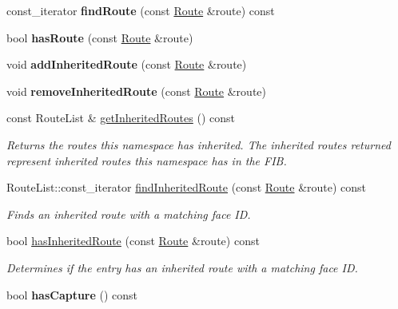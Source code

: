 \begin{DoxyCompactItemize}
\item 
const\+\_\+iterator {\bfseries find\+Route} (const \hyperlink{classnfd_1_1rib_1_1Route}{Route} \&route) const\hypertarget{classnfd_1_1rib_1_1RibEntry_ab8f111d73beaa1fca110e9986266afa0}{}\label{classnfd_1_1rib_1_1RibEntry_ab8f111d73beaa1fca110e9986266afa0}

\item 
bool {\bfseries has\+Route} (const \hyperlink{classnfd_1_1rib_1_1Route}{Route} \&route)\hypertarget{classnfd_1_1rib_1_1RibEntry_adb22892a49ce974b17d537cbe509aba1}{}\label{classnfd_1_1rib_1_1RibEntry_adb22892a49ce974b17d537cbe509aba1}

\item 
void {\bfseries add\+Inherited\+Route} (const \hyperlink{classnfd_1_1rib_1_1Route}{Route} \&route)\hypertarget{classnfd_1_1rib_1_1RibEntry_a181c7679d8cbabe84728b74aabe74629}{}\label{classnfd_1_1rib_1_1RibEntry_a181c7679d8cbabe84728b74aabe74629}

\item 
void {\bfseries remove\+Inherited\+Route} (const \hyperlink{classnfd_1_1rib_1_1Route}{Route} \&route)\hypertarget{classnfd_1_1rib_1_1RibEntry_a28f37bff182c049b0241ebacaaa8030b}{}\label{classnfd_1_1rib_1_1RibEntry_a28f37bff182c049b0241ebacaaa8030b}

\item 
const Route\+List \& \hyperlink{classnfd_1_1rib_1_1RibEntry_a39ac937096952d817038166eba9677ef}{get\+Inherited\+Routes} () const
\begin{DoxyCompactList}\small\item\em Returns the routes this namespace has inherited. The inherited routes returned represent inherited routes this namespace has in the F\+IB. \end{DoxyCompactList}\item 
Route\+List\+::const\+\_\+iterator \hyperlink{classnfd_1_1rib_1_1RibEntry_a102cc102a37a0e4c96d7faf64232cb73}{find\+Inherited\+Route} (const \hyperlink{classnfd_1_1rib_1_1Route}{Route} \&route) const
\begin{DoxyCompactList}\small\item\em Finds an inherited route with a matching face ID. \end{DoxyCompactList}\item 
bool \hyperlink{classnfd_1_1rib_1_1RibEntry_afd2774fbd9e67b029755911d888328bd}{has\+Inherited\+Route} (const \hyperlink{classnfd_1_1rib_1_1Route}{Route} \&route) const
\begin{DoxyCompactList}\small\item\em Determines if the entry has an inherited route with a matching face ID. \end{DoxyCompactList}\item 
bool {\bfseries has\+Capture} () const\hypertarget{classnfd_1_1rib_1_1RibEntry_ab4e7ea21137b5e295dad80e35d8b2248}{}\label{classnfd_1_1rib_1_1RibEntry_ab4e7ea21137b5e295dad80e35d8b2248}


\end{DoxyCompactItemize}
